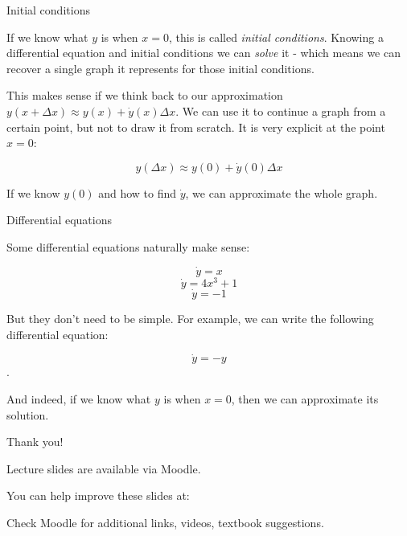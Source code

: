 \documentclass{beamer}
\begin{document}
\begin{frame}{Initial conditions}
	\begin{flushleft}
		
		If we know what $y$ is when $x = 0$, this is called \emph{initial conditions}. Knowing a differential equation and initial conditions we can \emph{solve} it - which means we can recover a single graph it represents for those initial conditions.
		
		\bigskip
		
		This makes sense if we think back to our approximation $y(x + \Delta x) \approx y(x) + \dot y (x) \Delta x$. We can use it to continue a graph from a certain point, but not to draw it from scratch. It is very explicit at the point $x = 0$:
		
		$$y(\Delta x) \approx y(0) + \dot y (0) \Delta x$$
		
		If we know $y(0)$ and how to find $\dot y$, we can approximate the whole graph. 
		
	\end{flushleft}
\end{frame}



\begin{frame}{Differential equations}
	\begin{flushleft}
		
		Some differential equations naturally make sense:
		
		$$\dot y = x$$
		$$\dot y = 4x^3 + 1$$
		$$\dot y = -1$$
		
		But they don't need to be simple. For example, we can write the following differential equation:
		
		$$\dot y = -y$$.
		
		And indeed, if we know what $y$ is when $x = 0$, then we can approximate its solution.
		
	\end{flushleft}
\end{frame}





\begin{frame}{Thank you!}
\centerline{Lecture slides are available via Moodle.}
\bigskip
\centerline{You can help improve these slides at:}
\centerline{\mygit}
\bigskip
\centerline{Check Moodle for additional links, videos, textbook suggestions.}
\bigskip

\centerline{\textcolor{black}{}}

\end{frame}
\end{document}
